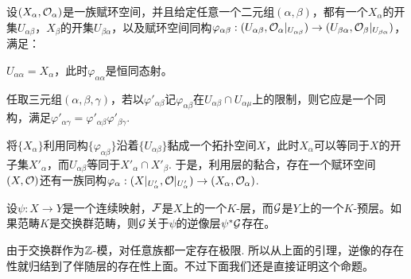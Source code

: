 \begin{pro}[赋环空间的黏合]\label{rsn}
设$(X_\alpha,\mathcal{O}_\alpha)$是一族赋环空间，并且给定任意一个二元组$(\alpha,\beta)$，都有一个$X_\alpha$的开集$U_{\alpha\beta}$，$X_\beta$的开集$U_{\beta\alpha}$，以及赋环空间同构$\varphi_{\alpha\beta}:(U_{\alpha\beta},\mathcal{O}_\alpha|_{U_{\alpha\beta}})\to (U_{\beta\alpha},\mathcal{O}_\beta|_{U_{\beta\alpha}})$，满足：
\begin{compactenum}[~~~1.]
\item $U_{\alpha\alpha}=X_\alpha$，此时$\varphi_{\alpha\alpha}$是恒同态射。
\item 任取三元组$(\alpha,\beta,\gamma)$，若以$\varphi'_{\alpha\beta}$记$\varphi_{\alpha\beta}$在$U_{\alpha\beta}\cap U_{\alpha\mu}$上的限制，则它应是一个同构，满足$\varphi'_{\alpha\gamma}=\varphi'_{\alpha\beta}\varphi'_{\beta\gamma}$.
\end{compactenum}

将$\{X_\alpha\}$利用同构$\{\varphi_{\alpha\beta}\}$沿着$\{U_{\alpha\beta}\}$黏成一个拓扑空间$X$，此时$X_\alpha$可以等同于$X$的开子集$X'_\alpha$，而$U_{\alpha\beta}$等同于$X'_\alpha\cap X'_\beta$. 于是，利用层的黏合，存在一个赋环空间$(X,\mathcal{O})$还有一族同构$\varphi_\alpha:(X|_{U'_\alpha},\mathcal{O}|_{U'_\alpha})\to (X_\alpha,\mathcal{O}_\alpha)$.
\end{pro}

\begin{pro}\label{proinverse}
设$\psi:X\to Y$是一个连续映射，$\mathcal{F}$是$X$上的一个$K$-层，而$\mathcal{G}$是$Y$上的一个$K$-预层。如果范畴$K$是交换群范畴，则$\mathcal{G}$关于$\psi$的逆像层$\psi^*\mathcal{G}$存在。
\end{pro}

由于交换群作为$\mathbb{Z}$-模，对任意族都一定存在极限. 所以从上面的引理，逆像的存在性就归结到了伴随层的存在性上面。不过下面我们还是直接证明这个命题。

